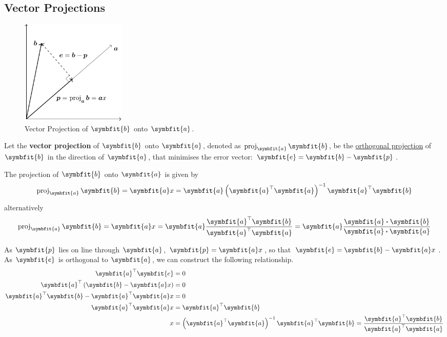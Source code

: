 \documentclass{article}
\begin{document}
	\subsection{Vector Projections}
	\begin{figure}[H]
		\centering
		\includegraphics[height=5cm, keepaspectratio]{figures/vector_projection.pdf}
		\caption{Vector Projection of $\symbfit{b}$ onto $\symbfit{a}$.}
	\end{figure}
	\begin{definition}
		Let the \textbf{vector projection} of $\symbfit{b}$ onto $\symbfit{a}$, denoted as $\proj_{\symbfit{a}}\symbfit{b}$, be the \linebreak \underline{orthogonal projection} of $\symbfit{b}$ in the direction of $\symbfit{a}$, that minimises the error vector: $\symbfit{e}=\symbfit{b}-\symbfit{p}$.
	\end{definition}
	\begin{theorem}
	The projection of $\symbfit{b}$ onto $\symbfit{a}$ is given by
	\begin{equation*}
		\proj_{\symbfit{a}}\symbfit{b} = \symbfit{a} x = \symbfit{a} \left( \symbfit{a}^\top \symbfit{a} \right)^{-1}\symbfit{a}^\top \symbfit{b}
	\end{equation*}
	alternatively
	\begin{equation*}
		\proj_{\symbfit{a}}\symbfit{b} = \symbfit{a} x = \symbfit{a} \frac{\symbfit{a}^\top \symbfit{b}}{\symbfit{a}^\top \symbfit{a}} = \symbfit{a} \frac{\symbfit{a}\vdot\symbfit{b}}{\symbfit{a}\vdot\symbfit{a}}
	\end{equation*}
	\end{theorem}
	\begin{solution}[Proof]
		As $\symbfit{p}$ lies on line through $\symbfit{a}$, $\symbfit{p}=\symbfit{a}x$, so that $\symbfit{e}=\symbfit{b}-\symbfit{a}x$. As $\symbfit{e}$ is orthogonal to $\symbfit{a}$, we can construct the following relationship.
		\begin{align*}
			\symbfit{a}^\top \symbfit{e} &= 0 \\
			\symbfit{a}^\top \left( \symbfit{b} - \symbfit{a}x \right) &= 0 \\
			\symbfit{a}^\top \symbfit{b} - \symbfit{a}^\top \symbfit{a}x &= 0 \\
			\symbfit{a}^\top \symbfit{a}x &= \symbfit{a}^\top \symbfit{b} \\
			x &= \left( \symbfit{a}^\top \symbfit{a} \right)^{-1}\symbfit{a}^\top \symbfit{b} = \frac{\symbfit{a}^\top \symbfit{b}}{\symbfit{a}^\top \symbfit{a}}
		\end{align*}
	\end{solution}
\end{document}
